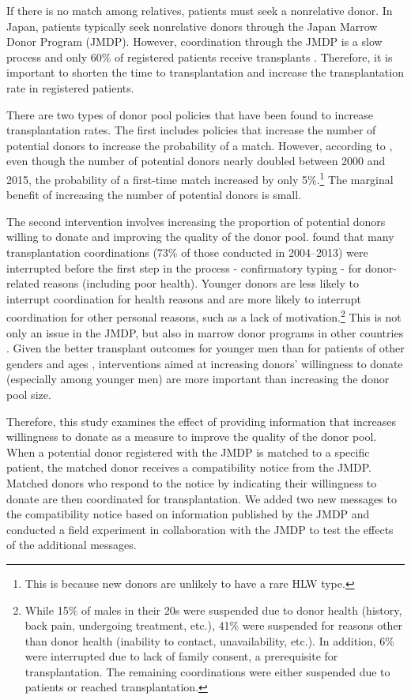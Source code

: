\documentclass[12pt, a4paper]{article}
\begin{document}
If there is no match among relatives, patients must seek a nonrelative donor. In Japan, patients typically seek nonrelative donors through the Japan Marrow Donor Program (JMDP). However, coordination through the JMDP is a slow process and only 60\% of registered patients receive transplants \citep{Hirakawa2018}. Therefore, it is important to shorten the time to transplantation and increase the transplantation rate in registered patients.

There are two types of donor pool policies that have been found to increase transplantation rates. The first includes policies that increase the number of potential donors to increase the probability of a match. However, according to \citet{Takanashi2016}, even though the number of potential donors nearly doubled between 2000 and 2015, the probability of a first-time match increased by only 5\%.\footnote{This is because new donors are unlikely to have a rare HLW type.} The marginal benefit of increasing the number of potential donors is small.

The second intervention involves increasing the proportion of potential donors willing to donate and improving the quality of the donor pool. \citet{Hirakawa2018} found that many transplantation coordinations (73\% of those conducted in 2004--2013) were interrupted before the first step in the process - confirmatory typing - for donor-related reasons (including poor health). Younger donors are less likely to interrupt coordination for health reasons and are more likely to interrupt coordination for other personal reasons, such as a lack of motivation.\footnote{While 15\% of males in their 20s were suspended due to donor health (history, back pain, undergoing treatment, etc.), 41\% were suspended for reasons other than donor health (inability to contact, unavailability, etc.). In addition, 6\% were interrupted due to lack of family consent, a prerequisite for transplantation. The remaining coordinations were either suspended due to patients or reached transplantation.} This is not only an issue in the JMDP, but also in marrow donor programs in other countries \citep{Haylock2022}. Given the better transplant outcomes for younger men than for patients of other genders and ages \citep[for example,][]{Kollman2016}, interventions aimed at increasing donors' willingness to donate (especially among younger men) are more important than increasing the donor pool size.

Therefore, this study examines the effect of providing information that increases willingness to donate as a measure to improve the quality of the donor pool. When a potential donor registered with the JMDP is matched to a specific patient, the matched donor receives a compatibility notice from the JMDP. Matched donors who respond to the notice by indicating their willingness to donate are then coordinated for transplantation. We added two new messages to the compatibility notice based on information published by the JMDP and conducted a field experiment in collaboration with the JMDP to test the effects of the additional messages.
\end{document}
